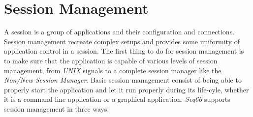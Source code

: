 %
%
%

\section{Session Management}
\label{sec:sessions}

   A session is a group of applications and their configuration and
   connections.
   Session management recreate complex setups and provides some uniformity
   of application control in a session.
   The first thing to do for session management is to make sure that the
   application is capable of various levels of session management, from
   \textsl{UNIX} signals to
   a complete session manager like the \textsl{Non/New Session Manager}.
   Basic session management consist of being able to properly start the
   application and let it run properly during its life-cyle, whether it is a
   command-line application or a graphical application.
   \textsl{Seq66} supports session management in three ways:

